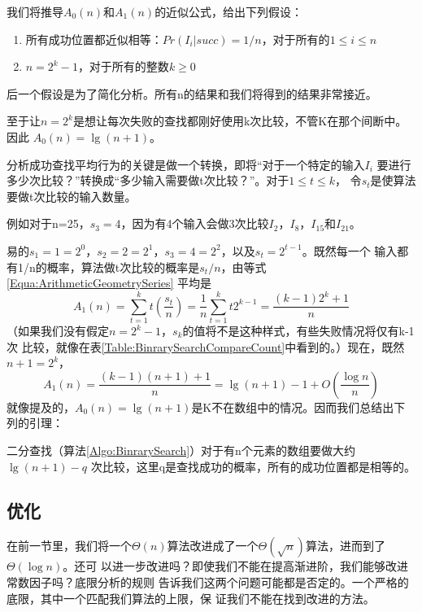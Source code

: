 我们将推导$A_0(n)$和$A_1(n)$的近似公式，给出下列假设：
\begin{enumerate}
\item 所有成功位置都近似相等：$Pr(I_i|succ)=1/n$，对于所有的$1\leq i \leq n$
\item $n=2^k-1$，对于所有的整数$k\geq 0$
\end{enumerate}
后一个假设是为了简化分析。所有n的结果和我们将得到的结果非常接近。

至于让$n=2^k$是想让每次失败的查找都刚好使用k次比较，不管K在那个间断中。因此
$A_0(n)=\lg(n+1)$。

分析成功查找平均行为的关键是做一个转换，即将“对于一个特定的输入$I_i$
要进行多少次比较？”转换成“多少输入需要做t次比较？”。对于$1\leq t \leq k$，
令$s_t$是使算法要做t次比较的输入数量。

例如对于n=25，$s_3=4$，因为有4个输入会做3次比较$I_2$，$I_8$，$I_{15}$和$I_{21}$。

易的$s_1=1=2^0$，$s_2=2=2^1$，$s_3=4=2^2$，以及$s_t=2^{t-1}$。既然每一个
输入都有1/n的概率，算法做t次比较的概率是$s_t/n$，由等式\ref{Equa:ArithmeticGeometrySeries}
平均是
\begin{displaymath}
A_1(n)=\sum\limits_{t=1}^{k}t\left(\frac{s_t}{n}\right)
=\frac{1}{n}\sum\limits_{t=1}^{k}t2^{k-1}=\frac{(k-1)2^k+1}{n}
\end{displaymath}
（如果我们没有假定$n=2^k-1$，$s_k$的值将不是这种样式，有些失败情况将仅有k-1次
比较，就像在表\ref{Table:BinrarySearchCompareCount}中看到的。）现在，既然$n+1=2^k$，
\begin{displaymath}
A_1(n)=\frac{(k-1)(n+1)+1}{n}=\lg(n+1)-1+O\left(\frac{\log n}{n}\right)
\end{displaymath}
就像提及的，$A_0(n)=\lg(n+1)$是K不在数组中的情况。因而我们总结出下列的引理：

\begin{theorem}
二分查找（算法\ref{Algo:BinrarySearch}）对于有n个元素的数组要做大约$\lg(n+1)-q$
次比较，这里q是查找成功的概率，所有的成功位置都是相等的。
\end{theorem}

\subsection{优化}
在前一节里，我们将一个$\Theta (n)$算法改进成了一个$\Theta
(\sqrt{n})$算法，进而到了$\Theta (\log n)$。还可
以进一步改进吗？即使我们不能在提高渐进阶，我们能够改进常数因子吗？底限分析的规则
告诉我们这两个问题可能都是否定的。一个严格的底限，其中一个匹配我们算法的上限，保
证我们不能在找到改进的方法。

